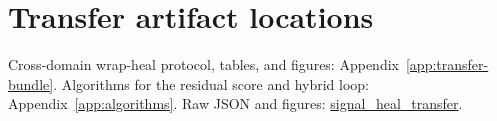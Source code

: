 
\section{Transfer artifact locations}
\label{app:transfer-pilot}

Cross-domain wrap-heal protocol, tables, and figures:
Appendix~\ref{app:transfer-bundle}.
Algorithms for the residual score and hybrid loop: Appendix~\ref{app:algorithms}.
Raw JSON and figures:
\href{https://github.com/reeldemo/denoise-opt}{signal\_heal\_transfer}.

